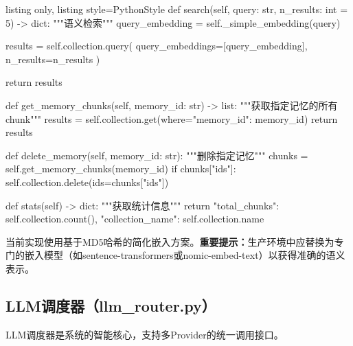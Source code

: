 \documentclass[12pt,a4paper,oneside]{article}
\begin{document}
\begin{tcblisting}{listing only, listing style=PythonStyle}
    def search(self, query: str, n_results: int = 5) -> dict:
        """语义检索"""
        query_embedding = self._simple_embedding(query)

        results = self.collection.query(
            query_embeddings=[query_embedding],
            n_results=n_results
        )

        return results

    def get_memory_chunks(self, memory_id: str) -> list:
        """获取指定记忆的所有chunk"""
        results = self.collection.get(where={"memory_id": memory_id})
        return results

    def delete_memory(self, memory_id: str):
        """删除指定记忆"""
        chunks = self.get_memory_chunks(memory_id)
        if chunks["ids"]:
            self.collection.delete(ids=chunks["ids"])

    def stats(self) -> dict:
        """获取统计信息"""
        return {
            "total_chunks": self.collection.count(),
            "collection_name": self.collection.name
        }
\end{tcblisting}

当前实现使用基于MD5哈希的简化嵌入方案。\textbf{重要提示：}生产环境中应替换为专门的嵌入模型（如sentence-transformers或nomic-embed-text）以获得准确的语义表示。

\subsection{LLM调度器（llm\_router.py）}

LLM调度器是系统的智能核心，支持多Provider的统一调用接口。
\end{document}
